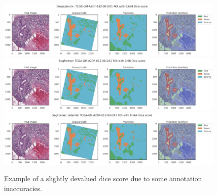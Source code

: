 \begin{figure}[H]
    \includegraphics[width=\linewidth]{figures/tissue/deeplabv3+_dice_tcga_TCGA-GM-A2DF-01Z-00-DX1CD0BE6D7-2DB3-4193-84CC-F9BE7BF18CC2_[25322,_21890,_27778,_24293]_check.png}
    \includegraphics[width=\linewidth]{figures/tissue/segformer_dice_tcga_TCGA-GM-A2DF-01Z-00-DX1CD0BE6D7-2DB3-4193-84CC-F9BE7BF18CC2_[25322,_21890,_27778,_24293]_check.png}
    \includegraphics[width=\linewidth]{figures/tissue/segformer,_adamw_dice_tcga_TCGA-GM-A2DF-01Z-00-DX1CD0BE6D7-2DB3-4193-84CC-F9BE7BF18CC2_[25322,_21890,_27778,_24293]_check.png}
    
    \caption{Example of a slightly devalued dice score due to some annotation inaccuracies.}
    \label{fig:TCGA-GM-A2DF}
\end{figure}
    

